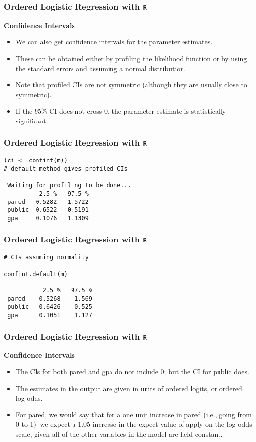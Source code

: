 \documentclass[00-GLMregslides.tex]{subfiles}
\begin{document}
	
\begin{frame}
		\frametitle{Ordered Logistic Regression with \texttt{R} }
	\Large
\textbf{Confidence Intervals}
	\begin{itemize}
\item We can also get confidence intervals for the parameter estimates. 
\item These can be obtained either by profiling the likelihood function or by using the standard errors and assuming a normal distribution.
\item Note that profiled CIs are not symmetric (although they are usually close to symmetric). 
\item If the 95\% CI does not cross 0, the parameter estimate is statistically significant.
\end{itemize}
\end{frame}
\begin{frame}[fragile]
		\frametitle{Ordered Logistic Regression with \texttt{R} }
		\Large
	\begin{verbatim}
(ci <- confint(m)) 
# default method gives profiled CIs

 Waiting for profiling to be done...
          2.5 %   97.5 %
 pared   0.5282   1.5722
 public -0.6522   0.5191
 gpa     0.1076   1.1309
\end{verbatim}
\end{frame}
\begin{frame}[fragile]
		\frametitle{Ordered Logistic Regression with \texttt{R} }
\Large
\begin{verbatim}
# CIs assuming normality

confint.default(m) 

           2.5 %   97.5 %
 pared    0.5268    1.569
 public  -0.6426    0.525
 gpa      0.1051    1.127
\end{verbatim}
\end{frame}
\begin{frame}
		\frametitle{Ordered Logistic Regression with \texttt{R} }
		\Large
\textbf{Confidence Intervals}
\begin{itemize}
\item The CIs for both pared and gpa do not include 0; but the CI for public does. 
\item The estimates in the output are given in units of ordered logits, or ordered log odds. 
\item For pared, we would say that for a one unit increase in pared (i.e., going from 0 to 1), we expect a 1.05 
increase in the expect value of apply on the log odds scale, given all of the other variables in the model are held constant. 
\end{itemize}
\end{frame}
\end{document}
